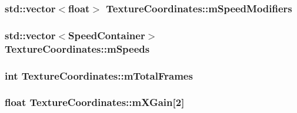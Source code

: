 \subsubsection[{\texorpdfstring{m\+Speed\+Modifiers}{mSpeedModifiers}}]{\setlength{\rightskip}{0pt plus 5cm}std\+::vector$<$float$>$ Texture\+Coordinates\+::m\+Speed\+Modifiers\hspace{0.3cm}{\ttfamily [private]}}\hypertarget{classTextureCoordinates_a710c4627d95401d092248edd0526700d}{}\label{classTextureCoordinates_a710c4627d95401d092248edd0526700d}
\subsubsection[{\texorpdfstring{m\+Speeds}{mSpeeds}}]{\setlength{\rightskip}{0pt plus 5cm}std\+::vector$<${\bf Speed\+Container}$>$ Texture\+Coordinates\+::m\+Speeds\hspace{0.3cm}{\ttfamily [private]}}\hypertarget{classTextureCoordinates_a6c5228a4c97ed8520208c2931b782cd5}{}\label{classTextureCoordinates_a6c5228a4c97ed8520208c2931b782cd5}
\subsubsection[{\texorpdfstring{m\+Total\+Frames}{mTotalFrames}}]{\setlength{\rightskip}{0pt plus 5cm}int Texture\+Coordinates\+::m\+Total\+Frames\hspace{0.3cm}{\ttfamily [private]}}\hypertarget{classTextureCoordinates_a54c70b943f6f15c0cec44083fd16e9c9}{}\label{classTextureCoordinates_a54c70b943f6f15c0cec44083fd16e9c9}
\subsubsection[{\texorpdfstring{m\+X\+Gain}{mXGain}}]{\setlength{\rightskip}{0pt plus 5cm}float Texture\+Coordinates\+::m\+X\+Gain\mbox{[}2\mbox{]}\hspace{0.3cm}{\ttfamily [private]}}\hypertarget{classTextureCoordinates_a611cbb70c81161901bbcab2b745f88c2}{}\label{classTextureCoordinates_a611cbb70c81161901bbcab2b745f88c2}
